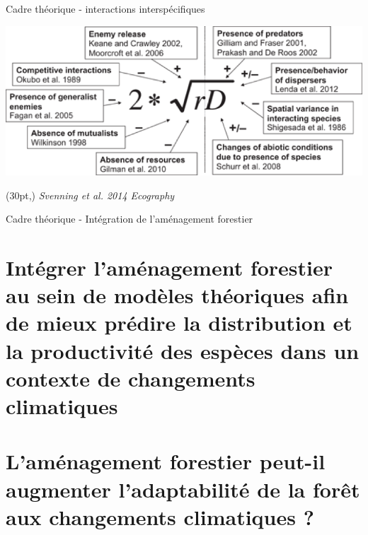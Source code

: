 \documentclass[11pt, compress, aspectratio=1610]{beamer}
\newcommand\smallcitation[1]{%
\begin{textblock*}{\textwidth}(30pt,\textheight)
	\raggedleft \footnotesize\textit{#1}
\end{textblock*}}
\begin{document}
\begin{frame}{Cadre théorique - interactions interspécifiques}

\centering
 \includegraphics[scale=0.8]{figures/Svenning2014.png}\par

\smallcitation{Svenning et al. 2014 Ecography}

\end{frame}

\begin{frame}{Cadre théorique - Intégration de l'aménagement forestier}

\centering
 \par

\end{frame}

\section{\texorpdfstring{Intégrer l'aménagement forestier \newline au
sein de modèles théoriques afin de mieux prédire la distribution
\newline et la productivité des espèces dans un contexte de changements
\newline climatiques}{Intégrer l'aménagement forestier au sein de modèles théoriques afin de mieux prédire la distribution et la productivité des espèces dans un contexte de changements climatiques}}\label{intuxe9grer-lamuxe9nagement-forestier-au-sein-de-moduxe8les-thuxe9oriques-afin-de-mieux-pruxe9dire-la-distribution-et-la-productivituxe9-des-espuxe8ces-dans-un-contexte-de-changements-climatiques}

\section{\texorpdfstring{L'aménagement forestier peut-il
\newline augmenter l'adaptabilité de la forêt aux changements
climatiques
?}{L'aménagement forestier peut-il augmenter l'adaptabilité de la forêt aux changements climatiques ?}}\label{lamuxe9nagement-forestier-peut-il-augmenter-ladaptabilituxe9-de-la-foruxeat-aux-changements-climatiques}
\end{document}
